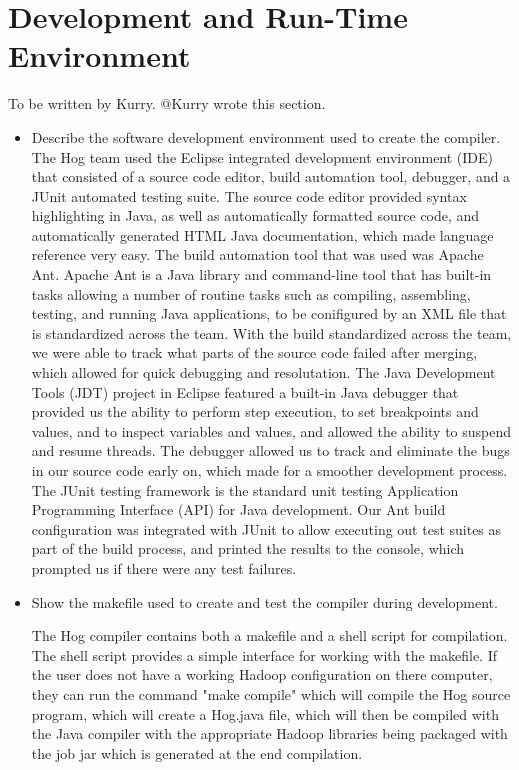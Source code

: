\documentclass{report}
\begin{document}
\chapter{Development and Run-Time Environment}
\label{chap:environ}

To be written by Kurry.
@Kurry wrote this section. 

\begin{itemize}
\item Describe the software development environment used to create the compiler.
	The Hog team used the Eclipse integrated development environment (IDE) that consisted of a
source code editor, build automation tool, debugger, and a  JUnit automated testing suite. The source
code editor provided syntax highlighting in Java, as well as automatically formatted source code, and automatically generated HTML Java documentation, which made language reference very easy. The 
build automation tool that was used was Apache Ant. Apache Ant is a Java library and command-line tool
that has built-in tasks allowing a number of routine tasks such as compiling, assembling, testing, and running Java applications, to be conifigured by an XML file that is standardized across the team. With the build standardized across the team, we were able to track what parts of the source code failed after merging,
which allowed for quick debugging and resolutation. The Java Development Tools (JDT) project in Eclipse featured a built-in Java debugger that provided us the ability to perform step execution, to set breakpoints and values, and to inspect variables and values, and allowed the ability to suspend and resume threads. The debugger allowed us to track and eliminate the bugs in our source code early on, which made for a smoother
development process. The JUnit testing framework is the standard unit testing Application Programming Interface (API) for Java development. Our Ant build configuration was integrated with JUnit to allow executing 
out test suites as part of the build process, and printed the results to the console, which prompted us if there
were any test failures. 


\item Show the makefile used to create and test the compiler during development.

	The Hog compiler contains both a makefile and a shell script for compilation. 
The shell script provides a simple interface for working with the makefile. If the user
does not have a working Hadoop configuration on there computer, they can run the
command "make compile" which will compile the Hog source program, which will 
create a Hog.java file, which will then be compiled with the Java compiler with the appropriate
Hadoop libraries being packaged with the job jar which is generated at the end compilation.


\end{itemize}
\end{document}
